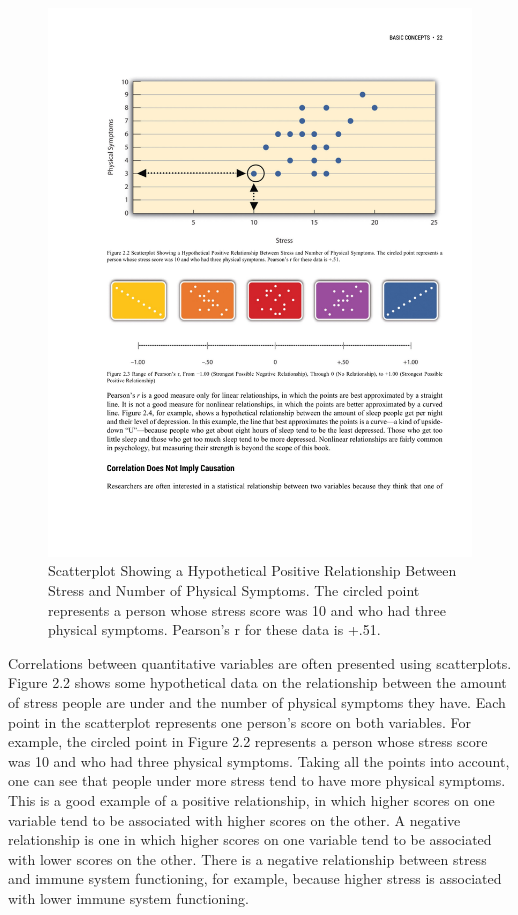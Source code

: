 \begin{figure}
      \includegraphics[width=.75\linewidth]{figures/C2F3Correlation.pdf}
      \caption{Scatterplot Showing a Hypothetical Positive Relationship Between Stress and Number of Physical Symptoms. The circled point represents a person whose stress score was 10 and who had three physical symptoms. Pearson’s r for these data is +.51.}
      \label{fig:Correlation}
\end{figure}


 Correlations between quantitative variables are often presented using scatterplots. Figure 2.2 shows some hypothetical data on the relationship between the amount of stress people are under and the number of physical symptoms they have. Each point in the scatterplot represents one person's score on both variables. For example, the circled point in Figure 2.2 represents a person whose stress score was 10 and who had three physical symptoms. Taking all the points into account, one can see that people under more stress tend to have more physical symptoms. This is a good example of a positive relationship, in which higher scores on one variable tend to be associated with higher scores on the other. A negative relationship is one in which higher scores on one variable tend to be associated with lower scores on the other. There is a negative relationship between stress and immune system functioning, for example, because higher stress is associated with lower immune system functioning.
 
